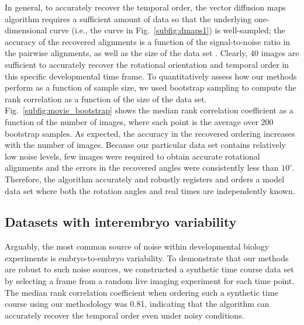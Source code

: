 \documentclass{pnastwo}
\newcommand{\fig}[0]{Fig.}
\begin{document}
\begin{article}
In general, to accurately recover the temporal order, the vector diffusion maps algorithm requires a sufficient amount of data so that the underlying one-dimensional curve (i.e., the curve in \fig~\ref{subfig:dmaps1}) is well-sampled;
the accuracy of the recovered alignments is a function of the signal-to-noise ratio in the pairwise alignments, as well as the size of the data set \cite{singer2011angular}.
%
Clearly, $40$ images are sufficient to accurately recover the rotational orientation and temporal order  in this specific developmental time frame.
%
To quantitatively assess how our methods perform as a function of sample size, we used bootstrap sampling to compute the rank correlation as a function of the size of the data set.
%
\fig~\ref{subfig:movie_bootstrap} shows the median rank correlation coefficient as a function of the number of images, where each point is the average over $200$ bootstrap samples.
%
As expected, the accuracy in the recovered ordering increases with the number of images. 
%
Because our particular data set contains relatively low noise levels, few images were required to obtain accurate rotational alignments and the errors in the recovered angles were consistently less than $10^{\circ}$.
%
Therefore, the algorithm accurately and robustly registers and orders a model data set where both the rotation angles and real times are independently known. 


\subsection{Datasets with interembryo variability}

Arguably, the most common source of noise within developmental biology experiments is embryo-to-embryo variability. 
%
To demonstrate that our methods are robust to such noise sources,
we constructed a synthetic time course data set by selecting a frame from a random live imaging experiment for each time point.
%
The median rank correlation coefficient when ordering such a synthetic time course using our methodology was 0.81, indicating that the algorithm can accurately recover the temporal order even under noisy conditions. 


\end{article}
\end{document}
